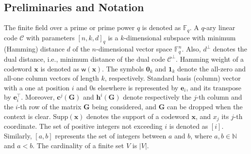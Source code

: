\documentclass[conference,letterpaper]{IEEEtran}
\begin{document}
\subsection{Preliminaries and Notation}
The finite field over a prime or prime power \(q\) is denoted as \(\mathbb{F}_q\). A \(q\)-ary linear code \(\mathcal{C}\) with parameters \([n, k, d]_q\) is a \(k\)-dimensional subspace with minimum (Hamming) distance $d$ of the \(n\)-dimensional vector space \(\mathbb{F}_q^n\). Also, $d^{\perp}$ denotes the dual distance, i.e., minimum distance of the dual code $\mathcal{C}^{\perp}$. Hamming weight of a codeword \(\boldsymbol{x}\) is denoted as \(\textsf{w}(\boldsymbol{x})\). The symbols \(\boldsymbol{0}_k\) and \(\boldsymbol{1}_k\) denote the all-zero and all-one column vectors of length \(k\), respectively. Standard basis (column) vector with a one at position \(i\) and 0s elsewhere is represented by \(\boldsymbol{e}_i\), and its transpose by $\boldsymbol{e}_i^{\top}$. Moreover, $\boldsymbol{c}^j(\boldsymbol{G})$ and $\boldsymbol{h}^i(\boldsymbol{G})$ denote respectively the $j$-th column and the $i$-th row of the matrix $\boldsymbol{G}$ being considered, and $\boldsymbol{G}$ can be dropped when the context is clear. \(\mathrm{Supp}(\boldsymbol{x})\) denotes the support of a codeword \(\boldsymbol{x}\), and $x_j$ its $j$-th coordinate. The set of positive integers not exceeding \(i\) is denoted as \([i]\). Similarly, \([a, b]\) represents the set of integers between \(a\) and \(b\), where \(a, b \in \mathbb{N}\) and \(a < b\). The cardinality of a finite set $V$ is $|V|$. 
\end{document}
